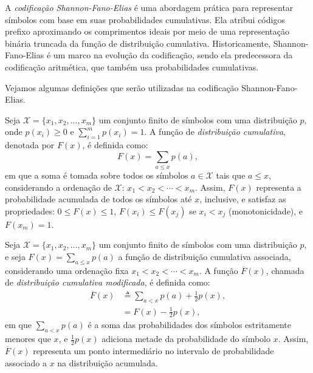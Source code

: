A \emph{codificação Shannon-Fano-Elias} é uma abordagem prática para representar
símbolos com base em suas probabilidades cumulativas. Ela atribui códigos
prefixo aproximando os comprimentos ideais por meio de uma representação
binária truncada da função de distribuição cumulativa. Historicamente,
Shannon-Fano-Elias é um marco na evolução da codificação, sendo ela
predecessora da codificação aritmética, que também usa probabilidades
cumulativas. 

Vejamos algumas definições que serão utilizadas na codificação Shannon-Fano-Elias.
\begin{definition}
Seja $\mathcal{X} = \{x_1, x_2, \ldots, x_m\}$ um conjunto finito de símbolos 
com uma distribuição $p$, onde $p(x_i) \geq 0$ e $\sum_{i=1}^m p(x_i) = 1$.
A função de \emph{distribuição cumulativa}, denotada por $F(x)$, é definida como:
\begin{equation}
F(x) = \sum_{a \leq x} p(a),
\end{equation}
em que a soma é tomada sobre todos os símbolos $a \in \mathcal{X}$ 
tais que $a \leq x$, considerando a ordenação de $\mathcal{X}$: 
$x_1 < x_2 < \cdots < x_m$. Assim, $F(x)$ representa a probabilidade acumulada
de todos os símbolos até $x$, inclusive, e satisfaz as propriedades: $0 \leq F(x) \leq 1$,
$F(x_i) \leq F(x_j)$ se $x_i < x_j$ (monotonicidade), e $F(x_m) = 1$. 
\end{definition}


\begin{definition}
Seja $\mathcal{X} = \{x_1, x_2, \ldots, x_m\}$ um conjunto finito de símbolos
com uma distribuição $p$, e seja $F(x) = \sum_{a \leq x} p(a)$ a função de
distribuição cumulativa associada, considerando uma ordenação fixa $x_1 < x_2 <
\cdots < x_m$. A função $\overline{F}(x)$, chamada de \emph{distribuição cumulativa
modificada}, é definida como:
\begin{subequations}
\begin{align}
\overline{F}(x) &\triangleq \sum_{a < x} p(a) + \frac{1}{2} p(x), \\
&= F(x) - \frac{1}{2} p(x),
\end{align}
\end{subequations}
em que $\sum_{a < x} p(a)$ é a soma das probabilidades dos símbolos
estritamente menores que $x$, e $\frac{1}{2} p(x)$ adiciona metade da
probabilidade do símbolo $x$. Assim, $\overline{F}(x)$ representa um ponto
intermediário no intervalo de probabilidade associado a $x$ na distribuição
acumulada.
\end{definition}

